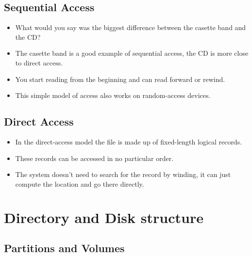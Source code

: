 \documentclass{beamer}
\begin{document}
\subsection{Sequential Access}

\begin{frame}{\insertsubsectionhead}
  \begin{itemize}
    \item What would you say was the biggest difference between the casette 
      band and the CD?

    \item The casette band is a good example of sequential access, the CD is 
      more close to direct access.

    \item You start reading from the beginning and can read forward or rewind.

    \item This simple model of access also works on random-access devices.

  \end{itemize}
\end{frame}

\subsection{Direct Access}

\begin{frame}{\insertsubsectionhead}
  \begin{itemize}
    \item In the direct-access model the file is made up of fixed-length 
      logical records.

    \item These records can be accessed in no particular order.

    \item The system doesn't need to search for the record by winding, it can 
      just compute the location and go there directly.

  \end{itemize}
\end{frame}


\section{Directory and Disk structure}

\subsection{Partitions and Volumes}
\end{document}
